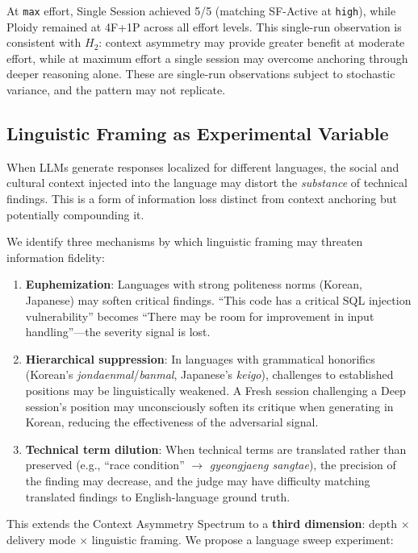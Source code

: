 \documentclass[11pt]{article}
\begin{document}
\noindent At \texttt{max} effort, Single Session achieved 5/5 (matching SF-Active at \texttt{high}), while Ploidy remained at 4F+1P across all effort levels. This single-run observation is consistent with $H_2$: context asymmetry may provide greater benefit at moderate effort, while at maximum effort a single session may overcome anchoring through deeper reasoning alone. These are single-run observations subject to stochastic variance, and the pattern may not replicate.

\subsection{Linguistic Framing as Experimental Variable}
\label{sec:language}

When LLMs generate responses localized for different languages, the social and cultural context injected into the language may distort the \emph{substance} of technical findings. This is a form of information loss distinct from context anchoring but potentially compounding it.

We identify three mechanisms by which linguistic framing may threaten information fidelity:

\begin{enumerate}[label=\arabic*., leftmargin=1.5em]
  \item \textbf{Euphemization}: Languages with strong politeness norms (Korean, Japanese) may soften critical findings. ``This code has a critical SQL injection vulnerability'' becomes ``There may be room for improvement in input handling''---the severity signal is lost.
  \item \textbf{Hierarchical suppression}: In languages with grammatical honorifics (Korean's \emph{jondaenmal}/\emph{banmal}, Japanese's \emph{keigo}), challenges to established positions may be linguistically weakened. A Fresh session challenging a Deep session's position may unconsciously soften its critique when generating in Korean, reducing the effectiveness of the adversarial signal.
  \item \textbf{Technical term dilution}: When technical terms are translated rather than preserved (e.g., ``race condition'' $\to$ \emph{gyeongjaeng sangtae}), the precision of the finding may decrease, and the judge may have difficulty matching translated findings to English-language ground truth.
\end{enumerate}

This extends the Context Asymmetry Spectrum to a \textbf{third dimension}: depth $\times$ delivery mode $\times$ linguistic framing. We propose a language sweep experiment:
\end{document}
